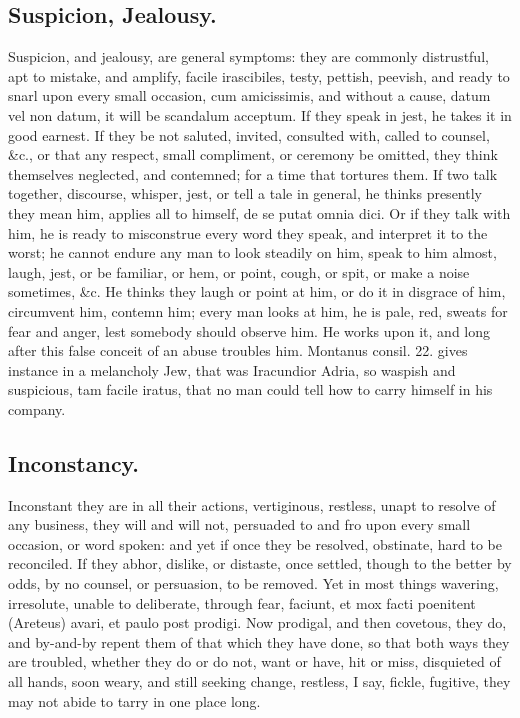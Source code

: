 {\subsection{Suspicion, Jealousy.}
Suspicion, and jealousy, are general symptoms:
they are commonly distrustful, apt to mistake, and amplify, facile
irascibiles, testy, pettish, peevish, and ready to snarl upon
every small occasion, cum amicissimis, and without a cause, datum
vel non datum, it will be scandalum acceptum. If they speak in jest, he
takes it in good earnest. If they be not saluted, invited, consulted
with, called to counsel, \&c., or that any respect, small compliment, or
ceremony be omitted, they think themselves neglected, and contemned;
for a time that tortures them. If two talk together, discourse,
whisper, jest, or tell a tale in general, he thinks presently they mean
him, applies all to himself, de se putat omnia dici. Or if they talk
with him, he is ready to misconstrue every word they speak, and
interpret it to the worst; he cannot endure any man to look steadily on
him, speak to him almost, laugh, jest, or be familiar, or hem, or
point, cough, or spit, or make a noise sometimes, \&c. He thinks
they laugh or point at him, or do it in disgrace of him, circumvent
him, contemn him; every man looks at him, he is pale, red, sweats for
fear and anger, lest somebody should observe him. He works upon it, and
long after this false conceit of an abuse troubles him. Montanus
consil. 22. gives instance in a melancholy Jew, that was Iracundior
Adria, so waspish and suspicious, tam facile iratus, that no man could
tell how to carry himself in his company.

\subsection{Inconstancy.}
Inconstant they are in all their actions, vertiginous,
restless, unapt to resolve of any business, they will and will not,
persuaded to and fro upon every small occasion, or word spoken: and yet
if once they be resolved, obstinate, hard to be reconciled. If they
abhor, dislike, or distaste, once settled, though to the better by
odds, by no counsel, or persuasion, to be removed. Yet in most things
wavering, irresolute, unable to deliberate, through fear, faciunt, et
mox facti poenitent (Areteus) avari, et paulo post prodigi. Now
prodigal, and then covetous, they do, and by-and-by repent them of that
which they have done, so that both ways they are troubled, whether they
do or do not, want or have, hit or miss, disquieted of all hands, soon
weary, and still seeking change, restless, I say, fickle, fugitive,
they may not abide to tarry in one place long.

}
